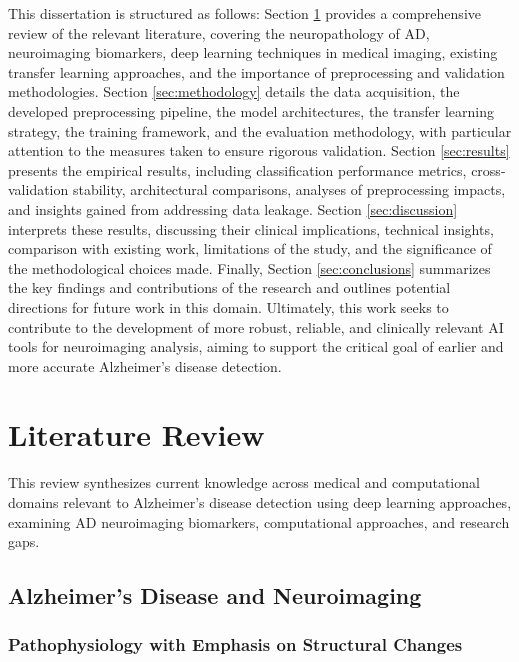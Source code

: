 \documentclass[11pt, a4paper]{article}
\begin{document}
This dissertation is structured as follows: Section \ref{sec:literature_review} provides a comprehensive review of the relevant literature, covering the neuropathology of AD, neuroimaging biomarkers, deep learning techniques in medical imaging, existing transfer learning approaches, and the importance of preprocessing and validation methodologies. Section \ref{sec:methodology} details the data acquisition, the developed preprocessing pipeline, the model architectures, the transfer learning strategy, the training framework, and the evaluation methodology, with particular attention to the measures taken to ensure rigorous validation. Section \ref{sec:results} presents the empirical results, including classification performance metrics, cross-validation stability, architectural comparisons, analyses of preprocessing impacts, and insights gained from addressing data leakage. Section \ref{sec:discussion} interprets these results, discussing their clinical implications, technical insights, comparison with existing work, limitations of the study, and the significance of the methodological choices made. Finally, Section \ref{sec:conclusions} summarizes the key findings and contributions of the research and outlines potential directions for future work in this domain. Ultimately, this work seeks to contribute to the development of more robust, reliable, and clinically relevant AI tools for neuroimaging analysis, aiming to support the critical goal of earlier and more accurate Alzheimer's disease detection.

\section{Literature Review}
\label{sec:literature_review}

This review synthesizes current knowledge across medical and computational domains relevant to Alzheimer's disease detection using deep learning approaches, examining AD neuroimaging biomarkers, computational approaches, and research gaps.

\subsection{Alzheimer's Disease and Neuroimaging}

\subsubsection{Pathophysiology with Emphasis on Structural Changes}
\end{document}
